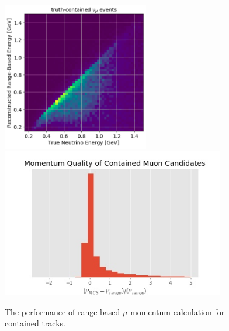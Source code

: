 \begin{figure}
    \centering
    \includegraphics[height=6.5cm]{NuMuCCsel/Images/Ryan/containedMomentumRes.png} \hspace{2mm}
    \includegraphics[height=6.5cm]{NuMuCCsel/Images/Ryan/muoncandidate_pquality.jpg} \hspace{2mm}
    \caption{The performance of range-based $\mu$ momentum calculation for contained tracks.}
    \label{fig:numusel:momres}
\end{figure}

